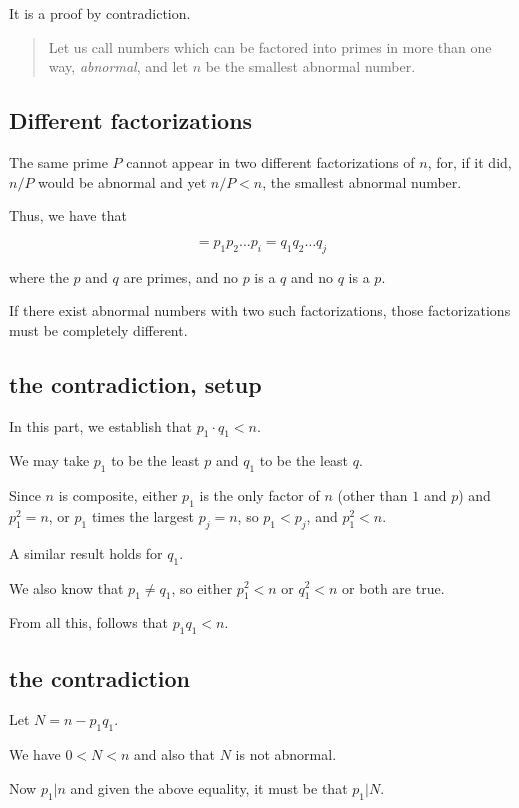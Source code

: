 \documentclass[11pt, oneside]{article}
\begin{document}
It is a proof by contradiction.

\begin{quote}Let us call numbers which can be factored into primes in more than one way, \emph{abnormal}, and let $n$ be the smallest abnormal number.\end{quote}

\subsection*{Different factorizations}

The same prime $P$ cannot appear in two different factorizations of $n$, for, if it did, $n/P$ would be abnormal and yet $n/P < n$, the smallest abnormal number.

Thus, we have that

\[  = p_1 p_2 \dots p_i = q_1 q_2 \dots q_j \]
    
where the $p$ and $q$ are primes, and no $p$ is a $q$ and no $q$ is a $p$.

If there exist abnormal numbers with two such factorizations, those factorizations must be completely different.

\subsection*{the contradiction, setup}

In this part, we establish that $p_1 \cdot q_1 < n$.

We may take $p_1$ to be the least $p$ and $q_1$ to be the least $q$.  

Since $n$ is composite, either $p_1$ is the only factor of $n$ (other than $1$ and $p$) and $p_1^2 = n$, or $p_1$ times the largest $p_j = n$, so $p_1 < p_j$, and $p_1^2 < n$.

A similar result holds for $q_1$.  

We also know that $p_1 \ne q_1$, so either $p_1^2 < n$ or $q_1^2 < n$ or both are true.

From all this, follows that $p_1 q_1 < n$. 

\subsection*{the contradiction} 

Let $N = n - p_1 q_1$.

We have $0 < N < n$ and also that $N$ is not abnormal.

Now $p_1 | n$ and given the above equality, it must be that $p_1 | N$.
\end{document}
